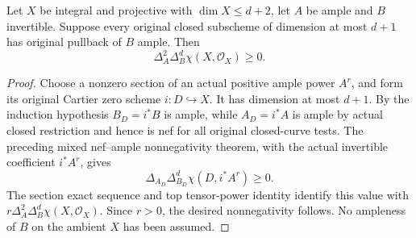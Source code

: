 \begin{lemma}
\label{lem:native-nef-ample-second-cut-nonnegative}
\leanok
{}
Let $X$ be integral and projective with $\dim X\leq d+2$, let
$A$ be ample and $B$ invertible. Suppose every original closed
subscheme of dimension at most $d+1$ has original pullback of $B$
ample. Then
\[
 \Delta_A^2\Delta_B^d\chi(X,\mathcal O_X)\geq0.
\]
\end{lemma}
\begin{proof}
Choose a nonzero section of an actual positive ample power $A^r$,
and form its original Cartier zero scheme $i:D\hookrightarrow X$.
It has dimension at most $d+1$. By the induction hypothesis
$B_D=i^*B$ is ample, while $A_D=i^*A$ is ample by actual closed
restriction and hence is nef for all original closed-curve tests.
The preceding mixed nef--ample nonnegativity theorem, with the
actual invertible coefficient $i^*A^r$, gives
\[
  \Delta_{A_D}\Delta_{B_D}^d\chi(D,i^*A^r)\geq0.
\]
The section exact sequence and top tensor-power identity identify
this value with
$r\Delta_A^2\Delta_B^d\chi(X,\mathcal O_X)$.
Since $r>0$, the desired nonnegativity follows. No ampleness of
$B$ on the ambient $X$ has been assumed.
\end{proof}

